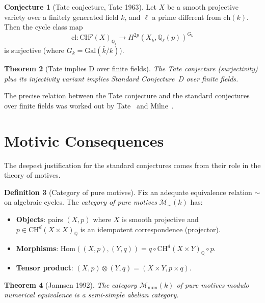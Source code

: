 \documentclass[12pt,a4paper]{amsart}
\newtheorem{theorem}{Theorem}[section]
\theoremstyle{definition}
\newtheorem{definition}[theorem]{Definition}
\newtheorem{conjecture}[theorem]{Conjecture}
\newcommand{\Q}{\mathbb{Q}}
\newcommand{\Gal}{\mathrm{Gal}}
\newcommand{\Hom}{\mathrm{Hom}}
\newcommand{\ch}{\mathrm{ch}}
\newcommand{\CH}{\mathrm{CH}}
\newcommand{\cl}{\mathrm{cl}}
\newcommand{\Hom}{\mathrm{Hom}}
\begin{document}
\begin{conjecture}[Tate conjecture, Tate 1963]
Let $X$ be a smooth projective variety over a finitely generated field $k$,
and $\ell$ a prime different from $\ch(k)$.  Then the cycle class map
\[
  \cl: \CH^p(X)_{\Q_\ell} \to H^{2p}(X_{\bar k}, \Q_\ell(p))^{G_k}
\]
is surjective (where $G_k = \Gal(\bar k/k)$).
\end{conjecture}

\begin{theorem}[Tate implies D over finite fields]
The Tate conjecture (surjectivity) plus its injectivity variant implies
Standard Conjecture~D over finite fields.
\end{theorem}

The precise relation between the Tate conjecture and the standard conjectures
over finite fields was worked out by Tate~\cite{tate1994} and Milne~\cite{milne2002}.

\section{Motivic Consequences}\label{sec:motives}

The deepest justification for the standard conjectures comes from their role
in the theory of motives.

\begin{definition}[Category of pure motives]
Fix an adequate equivalence relation $\sim$ on algebraic cycles.  The
\emph{category of pure motives} $\mathcal{M}_\sim(k)$ has:
\begin{itemize}
  \item \textbf{Objects}: pairs $(X, p)$ where $X$ is smooth projective and
        $p \in \CH^d(X \times X)_\Q$ is an idempotent correspondence (projector).
  \item \textbf{Morphisms}: $\Hom((X,p),(Y,q)) = q \circ \CH^d(X \times Y)_\Q \circ p$.
  \item \textbf{Tensor product}: $(X,p) \otimes (Y,q) = (X \times Y, p \times q)$.
\end{itemize}
\end{definition}

\begin{theorem}[Jannsen 1992]\label{thm:jannsen}
The category $\mathcal{M}_{\mathrm{num}}(k)$ of pure motives modulo numerical
equivalence is a \emph{semi-simple abelian category}.
\end{theorem}
\end{document}
